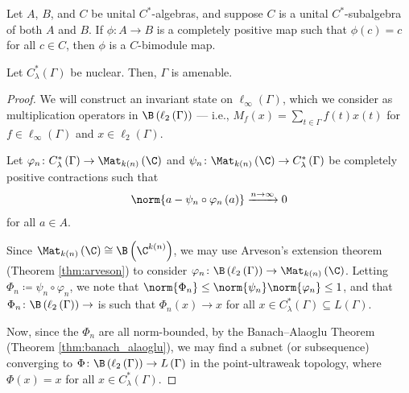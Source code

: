 \begin{corollary}\label{cor:multiplicative_domain}
  Let $A$, $B$, and $C$ be unital $C^{\ast}$-algebras, and suppose $C$ is a unital $C^{\ast}$-subalgebra of both $A$ and $B$. If $\phi\colon A\rightarrow B$ is a completely positive map such that $\phi(c) = c$ for all $c\in C$, then $\phi$ is a $C$-bimodule map.
\end{corollary}
\begin{theorem}\label{thm:nuclearity_implies_amenability}
  Let $C^{\ast}_{\lambda}\left( \Gamma \right)$ be nuclear. Then, $\Gamma$ is amenable.
\end{theorem}
\begin{proof}
  We will construct an invariant state on $\ell_{\infty}\left( \Gamma \right)$, which we consider as multiplication operators in $\B\left( \ell_2\left( \Gamma \right) \right)$ --- i.e., $M_{f}(x) = \sum_{t\in\Gamma}f(t)x(t)$ for $f\in \ell_{\infty}\left( \Gamma \right)$ and $x\in \ell_2\left( \Gamma \right)$.\newline

  Let $\varphi_n\colon C^{\ast}_{\lambda}\left( \Gamma \right)\rightarrow \Mat_{k(n)}\left( \C \right)$ and $\psi_n\colon \Mat_{k(n)}\left( \C \right)\rightarrow C^{\ast}_{\lambda}\left( \Gamma \right)$ be completely positive contractions such that
  \begin{align*}
    \norm{a - \psi_n\circ\varphi_n\left( a \right)}\xrightarrow{n\rightarrow\infty} 0
  \end{align*}
  for all $a\in A$.\newline

  Since $\Mat_{k(n)}\left( \C \right) \cong \B\left( \C^{k(n)} \right)$, we may use Arveson's extension theorem (Theorem \ref{thm:arveson}) to consider $\varphi_n\colon \B\left( \ell_2\left( \Gamma \right) \right)\rightarrow \Mat_{k(n)}\left( \C \right)$. Letting $\Phi_{n}\coloneq \psi_n\circ\varphi_n$, we note that $\norm{\Phi_n}\leq \norm{\psi_n}\norm{\varphi_n}\leq 1$, and that $\Phi_n\colon \B\left( \ell_2\left( \Gamma \right) \right)\rightarrow $ is such that $\Phi_n\left( x \right)\rightarrow x$ for all $x\in C^{\ast}_{\lambda}\left( \Gamma \right)\subseteq L\left( \Gamma \right)$.\newline

  Now, since the $\Phi_n$ are all norm-bounded, by the Banach--Alaoglu Theorem (Theorem \ref{thm:banach_alaoglu}), we may find a subnet (or subsequence) converging to $\Phi\colon \B\left( \ell_2\left( \Gamma \right) \right)\rightarrow L\left( \Gamma \right)$ in the point-ultraweak topology, where $\Phi(x) = x$ for all $x\in C^{\ast}_{\lambda}\left( \Gamma \right)$.\newline


\end{proof}
